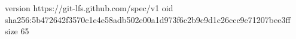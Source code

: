 version https://git-lfs.github.com/spec/v1
oid sha256:5b472642f3570c1e4e58adb502e00a1d973f6c2b9c9d1c26ccc9e71207bee3ff
size 65
